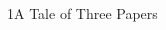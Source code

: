 \documentclass[xcolor=table,9pt,aspectratio=169]{beamer}
\begin{document}
\begin{frame}{\vspace*{10mm}1\hspace*{1em}A Tale of Three Papers}
\begin{multicols}{3}
\begin{center}

\end{center}
\end{multicols}
\end{frame}
\end{document}
